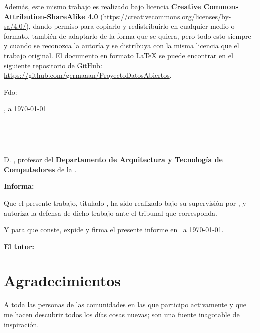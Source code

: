 \bigskip
Además, este mismo trabajo es realizado bajo licencia \textbf{Creative Commons Attribution-ShareAlike 4.0} (\url{https://creativecommons.org/licenses/by-sa/4.0/}), dando permiso para copiarlo y redistribuirlo en cualquier medio o formato, también de adaptarlo de la forma que se quiera, pero todo esto siempre y cuando se reconozca la autoría y se distribuya con la misma licencia que el trabajo original. El documento en formato {\sf LaTeX} se puede encontrar en el siguiente repositorio de {\sf GitHub}: \url{https://github.com/germaaan/ProyectoDatosAbiertos}.

\vspace{4cm}

\noindent Fdo: \autor

\vspace{2cm}

\begin{flushright}
\ciudad, a \today
\end{flushright}

\newpage
\thispagestyle{empty}
\
\vspace{3cm}

\noindent\rule[-1ex]{\textwidth}{2pt}\\[4.5ex]

D. \textbf{\tutor}, profesor del \textbf{Departamento de Arquitectura y Tecnología de Computadores} de la \textbf{\universidad}.

\vspace{0.5cm}

\vspace{0.5cm}

\textbf{Informa:}

\vspace{0.5cm}

Que el presente trabajo, titulado \textit{\textbf{\titulo}}, ha sido realizado bajo su supervisión por \textbf{\autor}, y 
autoriza la defensa de dicho trabajo ante el tribunal que corresponda.

\vspace{0.5cm}

Y para que conste, expide y firma el presente informe en \ciudad\ a \today.

\vspace{1cm}

\textbf{El tutor:}

\vspace{5cm}

\noindent \textbf{\tutor}

\chapter*{Agradecimientos}
\thispagestyle{empty}

\vspace{1cm}

A toda las personas de las comunidades en las que participo activamente y que me hacen descubrir todos los días cosas nuevas; son una fuente inagotable de inspiración.
